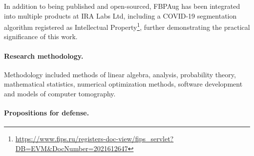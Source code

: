 In addition to being published and open-sourced, FBPAug has been integrated into multiple products at IRA Labs Ltd, including a COVID-19 segmentation algorithm registered as Intellectual Property\footnote{\href{https://www.fips.ru/registers-doc-view/fips\_servlet?DB=EVM\&DocNumber=2021612647}{https://www.fips.ru/registers-doc-view/fips\_servlet?DB=EVM\&DocNumber=2021612647}}, further demonstrating the practical significance of this work.


\paragraph{Research methodology.}

Methodology included methods of linear algebra, analysis, probability theory, mathematical statistics, numerical optimization methods, software development and models of computer tomography.



\paragraph{Propositions for defense.}

